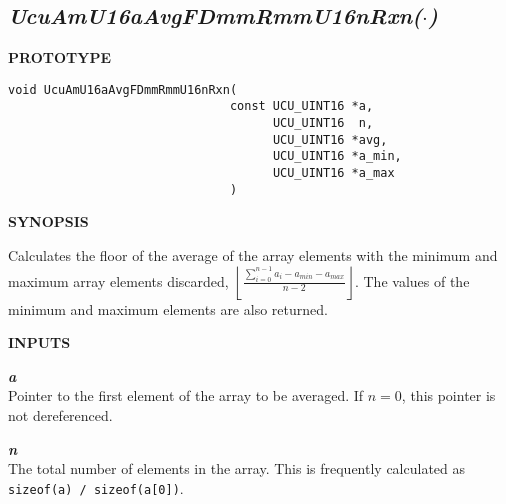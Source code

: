 \subsection[\emph{UcuAmU16aAvgFDmmRmmU16nRxn(\protect\mbox{\protect$\cdot$})}]
           {\emph{UcuAmU16aAvgFDmmRmmU16nRxn(\protect\mbox{\protect\boldmath $\cdot$})}}
\label{cami0:safn0:savg2}

%

\noindent\textbf{PROTOTYPE}
\begin {list}{}{\setlength{\leftmargin}{0.25in}\setlength{\topsep}{0.0in}}
\item
\begin{verbatim}
void UcuAmU16aAvgFDmmRmmU16nRxn(
                               const UCU_UINT16 *a, 
                                     UCU_UINT16  n, 
                                     UCU_UINT16 *avg, 
                                     UCU_UINT16 *a_min, 
                                     UCU_UINT16 *a_max
                               )
\end{verbatim}
\end{list}
\vspace{2.8ex}

\noindent\textbf{SYNOPSIS}
\begin{list}{}{\setlength{\leftmargin}{0.25in}\setlength{\topsep}{0.0in}}
\item Calculates the floor of the average of the array elements with the 
      minimum and maximum array elements discarded,
      $\displaystyle{\left\lfloor{\frac{\sum_{i=0}^{n-1}a_i - a_{min} - a_{max}}{n-2}}\right\rfloor}$.
      The values of the minimum and maximum elements are also returned.
\end{list}
\vspace{2.8ex}

\noindent\textbf{INPUTS}
\begin{list}{}{\setlength{\leftmargin}{0.5in}\setlength{\itemindent}{-0.25in}\setlength{\topsep}{0.0in}\setlength{\partopsep}{0.0in}}
\item \emph{\textbf{a}}\\
      Pointer to the first element of the array to be averaged.  If $n=0$, this
      pointer is not dereferenced.
\item \emph{\textbf{n}}\\
      The total number of elements in the array.  This is frequently
      calculated as \texttt{sizeof(a) / sizeof(a[0])}.
\end{list}
\vspace{2.8ex}

